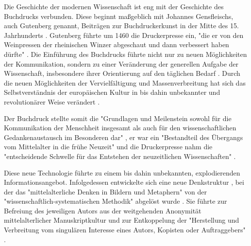 Die Geschichte der modernen Wissenschaft ist eng mit der Geschichte des Buchdrucks verbunden. Diese beginnt maßgeblich mit Johannes Gensfleischs, auch Gutenberg genannt, Beiträgen zur Buchdruckerkunst \cite{wittmann_1999_geschichte} in der Mitte des 15. Jahrhunderts \cite{suchen}. Gutenberg führte um 1460 die Druckerpresse ein, "die er von den Weinpressen der rheinischen Winzer abgeschaut und dann verbessert haben dürfte" \cite{stober_2014_pressegeschichte}. Die Einführung des Buchdrucks führte nicht nur zu neuen Möglichkeiten der Kommunikation, sondern zu einer Veränderung der generellen Aufgabe der Wissenschaft, insbesondere ihrer Orientierung auf den täglichen Bedarf \cite{Luhmann1998}. Durch die neuen Möglichkeiten der Vervielfältigung und Massenverbreitung hat sich das Selbstverständnis der europäischen Kultur in bis dahin unbekannter \cite{giesecke_1991_buchdruck} und revolutionärer Weise verändert \cite{wunderlich_2008_buchdruck} \cite{stober_2014_pressegeschichte}.

Der Buchdruck stellte somit die "Grundlagen und Meilenstein sowohl für die Kommunikation der Menschheit insgesamt als auch für den wissenschaftlichen Gedankenaustausch im Besonderen dar" \cite{schirmbacher_2009_wisspub}, er war ein "Bestandteil des Übergangs vom Mittelalter in die frühe Neuzeit" \cite{lange2008medienwettbewerb} und die Druckerpresse nahm die "entscheidende Schwelle für das Entstehen der neuzeitlichen Wissenschaften" \cite{luhmann_1997_gesellschaft}.

Diese neue Technologie führte zu einem bis dahin unbekannten, explodierenden Informationsangebot. Infolgedessen entwickelte sich eine neue Denkstruktur \cite{eisenstein_1997_druckerpresse}, bei der das "mittelalterliche Denken in Bildern und Metaphern" von der "wissenschaftlich-systematischen Methodik" abgelöst wurde \cite{wunderlich_2008_buchdruck}. Sie führte zur Befreiung des jeweiligen Autors aus der weitgehenden Anonymität mittelalterlicher Manuskriptkultur und zur Entkoppelung der "Herstellung und Verbreitung vom singulären Interesse eines Autors, Kopisten oder Auftraggebers" \cite{wunderlich_2008_buchdruck} \cite{schirmbacher_2009_wisspub}.

